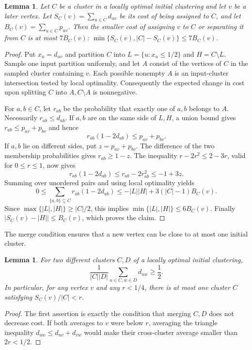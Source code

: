 \documentclass[11pt]{article}
\newtheorem{lemma}[theorem]{Lemma}
\begin{document}
\begin{lemma}
\label{seedext:onevertex}
Let $C$ be a cluster in a locally optimal initial clustering and let $v$ be a later vertex.
Let $S_C(v)=\sum_{u\in C}d_{uv}$ be its cost of being assigned to $C$,
and let $B_C(v)=\sum_{u\in C}p_{uv}$. Then the smaller cost of
assigning $v$ to $C$ or separating it from $C$ is at most $7B_C(v)$:
$\min\{S_C(v),|C|-S_C(v)\}\le7B_C(v)$.
\end{lemma}
\begin{proof}
Put $x_u=d_{uv}$ and partition $C$ into
$L=\{u:x_u\le 1/2\}$ and $H=C\setminus L$.
Sample one input partition uniformly, and let $A$ consist of the
vertices of $C$ in the sampled cluster containing $v$.  Each possible
nonempty $A$ is an input-cluster intersection tested by local optimality.
Consequently the expected change in cost upon splitting $C$ into
$A,C\setminus A$ is nonnegative.

For $a,b\in C$, let $r_{ab}$ be the probability that exactly one of
$a,b$ belongs to $A$.  Necessarily $r_{ab}\le d_{ab}$.  If $a,b$ are
on the same side of $L,H$, a union bound gives
$r_{ab}\le p_{av}+p_{bv}$ and hence
\[
 r_{ab}(1-2d_{ab})\le p_{av}+p_{bv}.
\]
If $a,b$ lie on different sides, put $z=p_{av}+p_{bv}$.
The difference of the two membership probabilities gives
$r_{ab}\ge 1-z$.  The inequality
$r-2r^2\le 2-3r$, valid for $0\le r\le1$, now gives
\[
 r_{ab}(1-2d_{ab})
 \le r_{ab}-2r_{ab}^2
 \le -1+3z.
\]
Summing over unordered pairs and using local optimality yields
\[
 0\le \sum_{\{a,b\}\subseteq C}r_{ab}(1-2d_{ab})
 \le -|L||H|+3(|C|-1)B_C(v).
\]
Since $\max\{|L|,|H|\}\ge |C|/2$, this implies
$\min\{|L|,|H|\}\le 6 B_C(v)$.
Finally $|S_C(v)-|H||\le B_C(v)$, which proves the claim.
\end{proof}

The merge condition ensures that a new vertex can be close to at most one initial cluster.

\begin{lemma}
\label{seedext:merge}
For two different clusters $C,D$ of a locally optimal initial clustering,
\[
 \frac1{|C||D|}\sum_{u\in C,w\in D}d_{uw}\ge\frac12.
\]
In particular, for any vertex $v$ and any $r<1/4$, there is at most
one cluster $C$ satisfying $S_C(v)/|C|<r$.
\end{lemma}
\begin{proof}
The first assertion is exactly the condition that merging $C,D$ does
not decrease cost.  If both averages to $v$ were below $r$, averaging
the triangle inequality $d_{uw}\le d_{uv}+d_{vw}$ would make their
cross-cluster average smaller than $2r<1/2$.
\end{proof}
\end{document}

